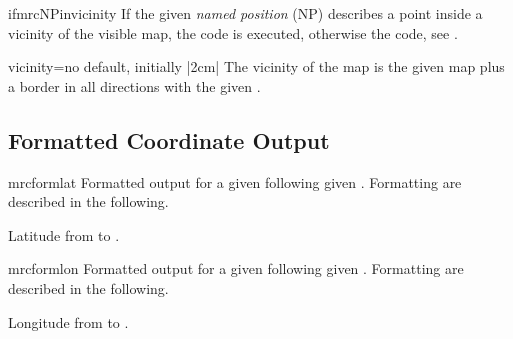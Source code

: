 \begin{docCommand}{ifmrcNPinvicinity}{}
  If the given \emph{named position} (NP)  describes a point
  inside a vicinity of the visible map, the  code is executed, otherwise
  the  code, see .
\begin{dispListing}
\end{dispListing}
\end{docCommand}


\begin{docMrcKey}{vicinity}{=}{no default, initially |2cm|}
  The vicinity of the map is the given map plus a border in all directions
  with the given .
\end{docMrcKey}


\clearpage
\subsection{Formatted Coordinate Output}

\begin{docCommand}{mrcformlat}{}
  Formatted output for a given  following given .
  Formatting  are described in the following.
  \begin{dispExample}
    Latitude from  to .
  \end{dispExample}
\end{docCommand}

\begin{docCommand}{mrcformlon}{}
  Formatted output for a given  following given .
  Formatting  are described in the following.
  \begin{dispExample}
    Longitude from  to .
  \end{dispExample}
\end{docCommand}


